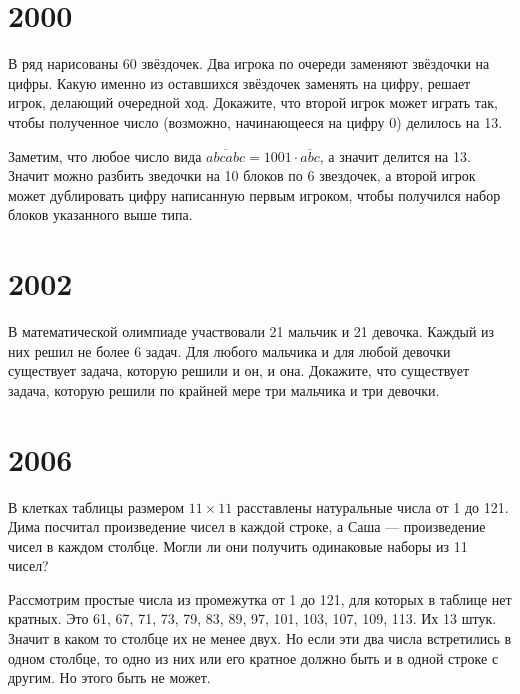 \documentclass[11pt, a4paper]{problems_template}
\begin{document}
\chapter{2000}

\begin{exercise}[1731]
В ряд нарисованы 60 звёздочек. Два игрока по очереди заменяют звёздочки на цифры. Какую именно из оставшихся звёздочек заменять на цифру, решает игрок, делающий очередной ход. Докажите, что второй игрок может играть так, чтобы полученное число (возможно, начинающееся на цифру 0) делилось на 13.
\end{exercise}

\begin{Solution}
Заметим, что любое число вида $\overline{abcabc} = 1001 \cdot \overline{abc}$, а значит делится на 13. Значит можно разбить зведочки на 10 блоков по 6 звездочек, а второй игрок может дублировать цифру написанную первым игроком, чтобы получился набор блоков указанного выше типа. 
\end{Solution}

\chapter{2002}

\begin{exercise}[1805]
В математической олимпиаде участвовали 21 мальчик и 21 девочка. Каждый
из них решил не более 6 задач. Для любого мальчика и для любой девочки
существует задача, которую решили и он, и она. Докажите, что существует задача, которую решили по крайней мере три мальчика и три девочки.
\end{exercise}

\chapter{2006}

\begin{exercise}[1981]
В клетках таблицы размером $11 \times 11$ расставлены натуральные числа от 1 до 121. Дима посчитал произведение чисел в каждой строке, а Саша — произведение чисел в каждом столбце. Могли ли они получить одинаковые наборы из 11 чисел?
\end{exercise}

\begin{Solution}
Рассмотрим простые числа из промежутка от 1 до 121, для которых в таблице нет кратных. Это 61, 67, 71, 73, 79, 83, 89, 97, 101, 103, 107, 109, 113. Их 13 штук. Значит в каком то столбце их не менее двух. Но если эти два числа встретились в одном столбце, то одно из них или его кратное должно быть и в одной строке с другим. Но этого быть не может.  
\end{Solution}
\end{document}
